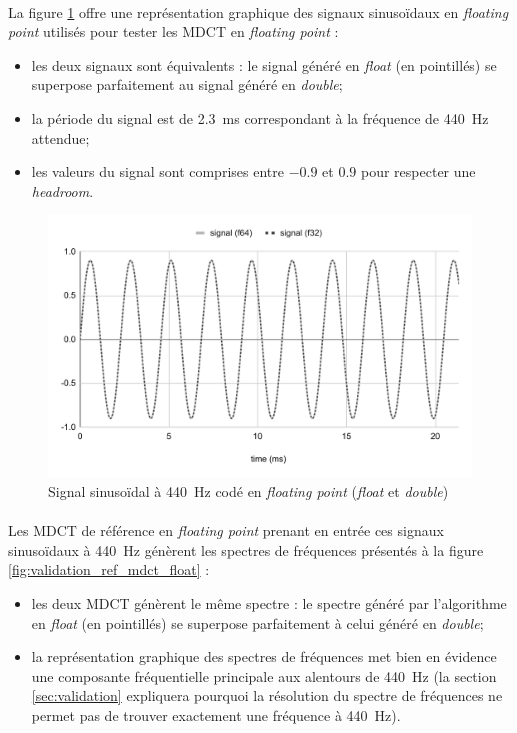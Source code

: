 \documentclass{article}
\begin{document}
    \paragraph{}
    La figure \ref{fig:signal_f32_f64} offre une représentation graphique des signaux sinusoïdaux en \emph{floating point} utilisés pour tester les MDCT en \emph{floating point} :
    \begin{itemize}
        \item les deux signaux sont équivalents : le signal généré en \emph{float} (en pointillés) se superpose parfaitement au signal généré en \emph{double};
        \item la période du signal est de \SI{2.3}{\milli\second} correspondant à la fréquence de \SI{440}{\hertz} attendue;
        \item les valeurs du signal sont comprises entre $-0.9$ et $0.9$ pour respecter une \emph{headroom}.
    \end{itemize}

    \begin{figure}[H]
        \centering
        \includegraphics[width=.8\linewidth]{./images/signal_f32_f64.pdf}
        \caption{Signal sinusoïdal à \SI{440}{\hertz} codé en \emph{floating point} (\emph{float} et \emph{double})}
        \label{fig:signal_f32_f64}
    \end{figure}

    \newpage
    \paragraph{}
    Les MDCT de référence en \emph{floating point} prenant en entrée ces signaux sinusoïdaux à \SI{440}{\hertz} génèrent les spectres de fréquences présentés à la figure \ref{fig:validation_ref_mdct_float} :
    \begin{itemize}
        \item les deux MDCT génèrent le même spectre : le spectre généré par l'algorithme en \emph{float} (en pointillés) se superpose parfaitement à celui généré en \emph{double};
        \item la représentation graphique des spectres de fréquences met bien en évidence une composante fréquentielle principale aux alentours de \SI{440}{\hertz} (la section \ref{sec:validation} expliquera pourquoi la résolution du spectre de fréquences ne permet pas de trouver exactement une fréquence à \SI{440}{\hertz}).
    \end{itemize}
\end{document}
